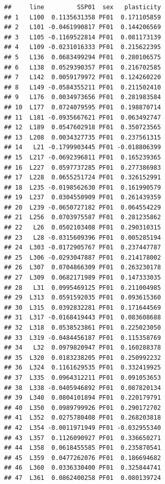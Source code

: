 \documentclass[
]{article}
\newenvironment{Shaded}{\begin{snugshade}}{\end{snugshade}}
\newcommand{\KeywordTok}[1]{\textcolor[rgb]{0.13,0.29,0.53}{\textbf{#1}}}
\newcommand{\NormalTok}[1]{#1}
\newcommand{\OperatorTok}[1]{\textcolor[rgb]{0.81,0.36,0.00}{\textbf{#1}}}
\newcommand{\StringTok}[1]{\textcolor[rgb]{0.31,0.60,0.02}{#1}}
\begin{document}
\begin{Shaded}
\end{Shaded}

\begin{verbatim}
##     line         SSP01  sex   plasticity
## 1   L100  0.1135631358 PF01  0.171105859
## 2   L101 -0.0461990817 PF01  0.144206569
## 3   L105 -0.1169522814 PF01  0.081173139
## 4   L109 -0.0231016333 PF01  0.215622395
## 5   L136  0.0683499294 PF01  0.280106575
## 6   L138  0.0529390357 PF01  0.216702585
## 7   L142  0.0059179972 PF01  0.124260220
## 8   L149 -0.0584355211 PF01  0.211502410
## 9   L176  0.0034973656 PF01  0.281983584
## 10  L177  0.0724079595 PF01  0.198870714
## 11  L181 -0.0935667621 PF01  0.063492747
## 12  L189  0.0547602918 PF01  0.350723565
## 13  L208  0.0034327735 PF01  0.237561315
## 14   L21 -0.1799903445 PF01 -0.018806399
## 15  L217 -0.0692396811 PF01  0.165239365
## 16  L227  0.0597737285 PF01  0.277386983
## 17  L228  0.0655251724 PF01  0.326152991
## 18  L235 -0.0198562630 PF01  0.161990579
## 19  L237  0.0304550909 PF01  0.261439359
## 20  L239 -0.0650727182 PF01  0.064554229
## 21  L256  0.0703975587 PF01  0.281235862
## 22   L26  0.0502103408 PF01  0.290310315
## 23   L28 -0.0315609396 PF01  0.005285194
## 24  L303 -0.0172905767 PF01  0.237447787
## 25  L306 -0.0293047887 PF01  0.214178002
## 26  L307  0.0704866309 PF01  0.263230178
## 27  L309  0.0682171989 PF01  0.147333035
## 28   L31  0.0995469125 PF01  0.211004985
## 29  L313  0.0591592035 PF01  0.093615360
## 30  L315  0.0392832281 PF01  0.171644569
## 31  L317 -0.0168419443 PF01  0.083608688
## 32  L318  0.0538523861 PF01  0.225023050
## 33  L319 -0.0484456187 PF01  0.115358769
## 34   L32  0.0979820947 PF01  0.160288378
## 35  L320  0.0183238205 PF01  0.250992232
## 36  L324  0.1161629535 PF01  0.332419925
## 37  L335  0.0964312211 PF01  0.091053653
## 38  L338 -0.0405946892 PF01  0.087820134
## 39  L340  0.0804101894 PF01  0.220179791
## 40  L350  0.0989799926 PF01  0.290172702
## 41  L352  0.0275780408 PF01  0.268203818
## 42  L354 -0.0011971949 PF01 -0.032955340
## 43  L357  0.1126090927 PF01  0.336650271
## 44  L358  0.0618455585 PF01  0.235870541
## 45  L359  0.0477262076 PF01  0.186694682
## 46  L360  0.0336330400 PF01  0.325844741
## 47  L361  0.0862400258 PF01  0.080139724

\end{verbatim}
\end{document}
